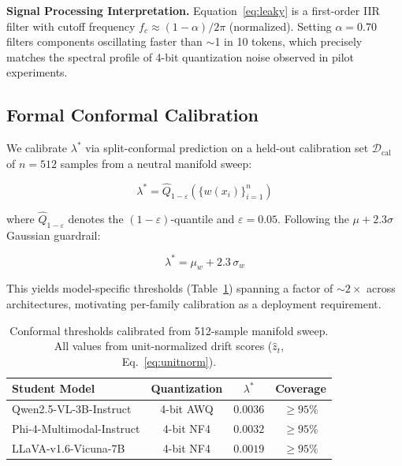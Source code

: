\documentclass[runningheads]{llncs}
\newcommand{\lstar}{\lambda^*}
\begin{document}
\noindent\textbf{Signal Processing Interpretation.}
Equation~\ref{eq:leaky} is a first-order IIR filter with cutoff frequency
$f_c \approx (1-\alpha)/2\pi$ (normalized). Setting $\alpha=0.70$ filters
components oscillating faster than $\sim$1 in 10 tokens, which precisely
matches the spectral profile of 4-bit quantization noise observed in pilot
experiments.

\subsection{Formal Conformal Calibration}

We calibrate $\lstar$ via split-conformal prediction on a held-out calibration
set $\mathcal{D}_\mathrm{cal}$ of $n=512$ samples from a neutral manifold sweep:

\begin{equation}
  \lstar = \hat{Q}_{1-\varepsilon}\!\left(\{w(x_i)\}_{i=1}^{n}\right)
  \label{eq:calibration}
\end{equation}

where $\hat{Q}_{1-\varepsilon}$ denotes the $(1-\varepsilon)$-quantile
and $\varepsilon = 0.05$. Following the $\mu + 2.3\sigma$ Gaussian guardrail:

\begin{equation}
  \lstar = \mu_w + 2.3\,\sigma_w
  \label{eq:guardrail}
\end{equation}

This yields model-specific thresholds (Table~\ref{tab:thresholds}) spanning
a factor of $\sim 2\times$ across architectures, motivating per-family
calibration as a deployment requirement.

\begin{table}[t]
  \centering
  \caption{Conformal thresholds calibrated from 512-sample manifold sweep.
  All values from unit-normalized drift scores ($\hat{z}_t$, Eq.~\ref{eq:unitnorm}).}
  \label{tab:thresholds}
  \small
  \begin{tabular}{@{}lccc@{}}
    \toprule
    \textbf{Student Model} & \textbf{Quantization} & $\lstar$ & \textbf{Coverage} \\
    \midrule
    Qwen2.5-VL-3B-Instruct & 4-bit AWQ & $0.0036$ & $\geq 95\%$ \\
    Phi-4-Multimodal-Instruct & 4-bit NF4 & $0.0032$ & $\geq 95\%$ \\
    LLaVA-v1.6-Vicuna-7B & 4-bit NF4 & $0.0019$ & $\geq 95\%$ \\
    \bottomrule
  \end{tabular}
\end{table}
\end{document}
